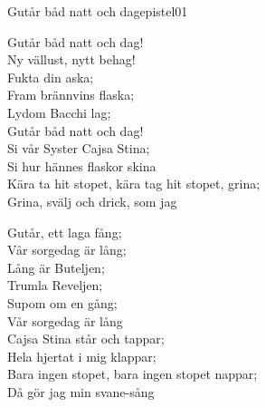 \begin{song}{Gutår båd natt och dag}{epistel01}
\begin{vers}
Gutår båd natt och dag!\\
Ny vällust, nytt behag!\\
Fukta din aska;\\
Fram brännvins flaska;\\
Lydom Bacchi lag;\\
Gutår båd natt och dag!\\
Si vår Syster Cajsa Stina;\\
Si hur hännes flaskor skina\\
Kära ta hit stopet, kära tag hit stopet, grina;\\
Grina, svälj och drick, som jag\\
\end{vers}
\begin{vers}
Gutår, ett laga fång;\\
Vår sorgedag är lång;\\
Lång är Buteljen;\\
Trumla Reveljen;\\
Supom om en gång;\\
Vår sorgedag är lång\\
Cajsa Stina står och tappar;\\
Hela hjertat i mig klappar;\\
Bara ingen stopet, bara ingen stopet nappar;\\
Då gör jag min svane-sång\\
\end{vers}
\end{song}
